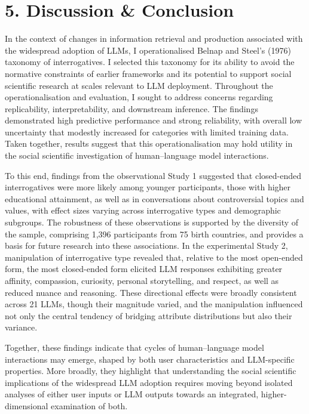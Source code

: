 \documentclass[
  12pt,
]{article}
\begin{document}
\section{5. Discussion \& Conclusion}\label{discussion-conclusion}

In the context of changes in information retrieval and production associated with the widespread adoption of LLMs, I operationalised Belnap and Steel's (1976) taxonomy of interrogatives. I selected this taxonomy for its ability to avoid the normative constraints of earlier frameworks and its potential to support social scientific research at scales relevant to LLM deployment. Throughout the operationalisation and evaluation, I sought to address concerns regarding replicability, interpretability, and downstream inference. The findings demonstrated high predictive performance and strong reliability, with overall low uncertainty that modestly increased for categories with limited training data. Taken together, results suggest that this operationalisation may hold utility in the social scientific investigation of human--language model interactions.

To this end, findings from the observational Study 1 suggested that closed-ended interrogatives were more likely among younger participants, those with higher educational attainment, as well as in conversations about controversial topics and values, with effect sizes varying across interrogative types and demographic subgroups. The robustness of these observations is supported by the diversity of the sample, comprising 1,396 participants from 75 birth countries, and provides a basis for future research into these associations. In the experimental Study 2, manipulation of interrogative type revealed that, relative to the most open-ended form, the most closed-ended form elicited LLM responses exhibiting greater affinity, compassion, curiosity, personal storytelling, and respect, as well as reduced nuance and reasoning. These directional effects were broadly consistent across 21 LLMs, though their magnitude varied, and the manipulation influenced not only the central tendency of bridging attribute distributions but also their variance.

Together, these findings indicate that cycles of human--language model interactions may emerge, shaped by both user characteristics and LLM-specific properties. More broadly, they highlight that understanding the social scientific implications of the widespread LLM adoption requires moving beyond isolated analyses of either user inputs or LLM outputs towards an integrated, higher-dimensional examination of both.
\end{document}
